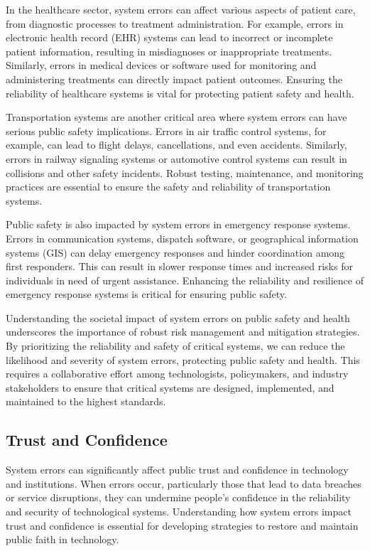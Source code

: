 \documentclass[10pt, conference, letterpaper]{IEEEtran}
\begin{document}
In the healthcare sector, system errors can affect various aspects of patient care, from diagnostic processes to treatment administration. For example, errors in electronic health record (EHR) systems can lead to incorrect or incomplete patient information, resulting in misdiagnoses or inappropriate treatments. Similarly, errors in medical devices or software used for monitoring and administering treatments can directly impact patient outcomes. Ensuring the reliability of healthcare systems is vital for protecting patient safety and health.

Transportation systems are another critical area where system errors can have serious public safety implications. Errors in air traffic control systems, for example, can lead to flight delays, cancellations, and even accidents. Similarly, errors in railway signaling systems or automotive control systems can result in collisions and other safety incidents. Robust testing, maintenance, and monitoring practices are essential to ensure the safety and reliability of transportation systems.

Public safety is also impacted by system errors in emergency response systems. Errors in communication systems, dispatch software, or geographical information systems (GIS) can delay emergency responses and hinder coordination among first responders. This can result in slower response times and increased risks for individuals in need of urgent assistance. Enhancing the reliability and resilience of emergency response systems is critical for ensuring public safety.

Understanding the societal impact of system errors on public safety and health underscores the importance of robust risk management and mitigation strategies. By prioritizing the reliability and safety of critical systems, we can reduce the likelihood and severity of system errors, protecting public safety and health. This requires a collaborative effort among technologists, policymakers, and industry stakeholders to ensure that critical systems are designed, implemented, and maintained to the highest standards.

\subsection{Trust and Confidence}
System errors can significantly affect public trust and confidence in technology and institutions. When errors occur, particularly those that lead to data breaches or service disruptions, they can undermine people's confidence in the reliability and security of technological systems. Understanding how system errors impact trust and confidence is essential for developing strategies to restore and maintain public faith in technology.
\end{document}
